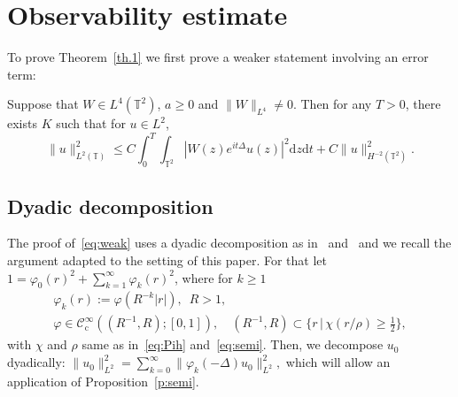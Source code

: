 \documentclass[10pt]{amsart}
\theoremstyle{definition}\newtheorem{defi}[theo]{Definition}\newtheorem{rema}[theo]{Remark}\newtheorem{exam}[theo]{Example}\newtheorem{exem}[theo]{Example}\newtheorem{nota}[theo]{Notation}
\newcommand{\CIc}{{\mathcal C}^\infty_{\mathrm{c}} }
\newcommand{\TT}{{\mathbb T}}
\newcommand*{\dd}{\mathrm{d}}
\newcommand*{\dz}{\dd z}
\newcommand*{\dt}{\dd t}
\newcommand*{\tq}{\,|\,}
\begin{document}
\section{Observability estimate}\label{obs}

To prove Theorem~\ref{th.1} we first prove a weaker statement involving an error term:

\begin{prop}\label{p:weak}
Suppose that $ W \in L^4 (\TT^2) $, $ a \geq 0 $ and $ \| W \|_{ L^4 } \neq 0 $. Then for any $ T > 0 $, there exists $ K $ such that for $ u \in L^2 $,
\begin{equation}\label{eq:weak}
\| u \|_{ L^2 (\TT) }^2 \leq C \int_0^T \int_{\TT^2 } | W(z) e^{ i t \Delta } u (z) |^2 \dz \dt + C \| u \|^2_{ H^{-2} (\TT^2) }.
\end{equation}
\end{prop}

\subsection{Dyadic decomposition}\label{dya}
The proof of~\eqref{eq:weak} uses a dyadic decomposition as in~\cite[Section~5.1]{BBZ} and~\cite[Section~4]{BZ4} and we recall the argument adapted to the setting of this paper. For that let $ 1= \varphi_{0} (r)^2 + \sum_{k=1}^{\infty} \varphi_{k} (r)^2$, where for $ k \geq 1 $
\begin{gather*}
\varphi_{k} (r) := \varphi(R ^{-k} |r|), \enspace R > 1, \\ \varphi \in \CIc ((R^{-1}, R) ; [0, 1]), \quad (R^{-1}, R) \subset \{ r \tq \chi(r / \rho) \geq
\textstyle{\frac12} \},
\end{gather*}
with $ \chi $ and $ \rho $ same as in~\eqref{eq:Pih} and~\eqref{eq:semi}. Then, we decompose $u_0$ dyadically: $\|u_0 \|^2_{L^2} = \sum_{k=0}^\infty \|\varphi_{k}(- \Delta) u_0 \|_{L^2}^2, $ which will allow an application of Proposition~\ref{p:semi}.
\end{document}
